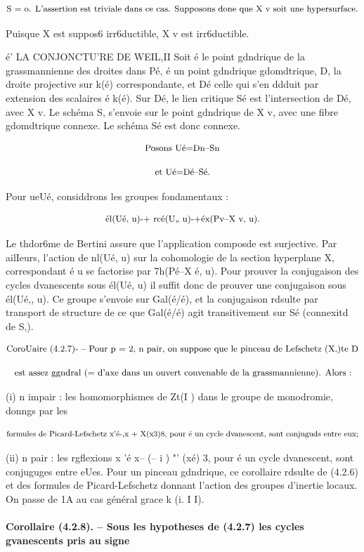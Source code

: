 \documentclass[11pt]{article}
\theoremstyle{remark}
\begin{document}
\[\text{\small S = o. L'assertion est triviale dans ce cas. Supposons done que X v soit une hypersurface.}\]

Puisque X est suppos6 irr6ductible, X v est irr6ductible.

é' LA CONJONCTU'RE DE WEIL,II Soit é le point gdndrique de la grassmannienne des droites dans Pé, é un point gdndrique gdomdtrique, D, la droite projective sur k(é) correspondante, et Dé celle qui s'en ddduit par extension des scalaires é k(é). Sur Dé, le lien critique Sé est l'intersection de Dé, avec X v. Le schéma S, s'envoie sur le point gdndrique de X v, avec une fibre gdomdtrique connexe. Le schéma Sé est donc connexe.

\[\text{\small Posons Ué=Dn--Sn}\]

\[\text{\small et Ué=Dé--Sé.}\]

Pour ueUé, considdrons les groupes fondamentaux :

\[\text{\small él(Ué, u)-+ rcé(U,, u)-+éx(Pv--X v, u).}\]

Le thdor6me de Bertini assure que l'application composde est surjective. Par ailIeurs, l'action de nl(Ué, u) sur la cohomologie de la section hyperplane X, correspondant é u se factorise par 7h(Pé--X é, u). Pour prouver la conjugaison des cycles dvanescents sous él(Ué, u) il suffit donc de prouver une conjugaison sous él(Ué,, u). Ce groupe s'envoie sur Gal(é/é), et la conjugaison rdsulte par transport de structure de ce que Gal(é/é) agit transitivement sur Sé (connexitd de S,).

\[\text{\small CoroUaire (4.2.7)- -- Pour p = 2, n pair, on suppose que le pinceau de Lefschetz (X,)te D}\]

\[\text{\small est assez ggndral (= d'axe dans un ouvert convenable de la grassmannienne). Alors :}\]

(i) n impair : les homomorphismes de Zt(I ) dans le groupe de monodromie, donngs par les

\[\text{\small formules de Picard-Lefschetz x'é-,x + X(x3)8, pour é un cycle dvanescent, sont conjuguds entre eux;}\]

(ii) n pair : les rgflexions x 'é x-- (-- i ) "' (xé) 3, pour é un cycle dvanescent, sont conjuguges entre eUes. Pour un pinceau gdndrique, ce corollaire rdsulte de (4.2.6) et des formules de Picard-Lefschetz donnant l'action des groupes d'inertie locaux. On passe de 1A au cas général grace k (i. I I).

\paragraph{Corollaire (4.2.8). -- Sous les hypotheses de (4.2.7) les cycles gvanescents pris au signe}
\end{document}

